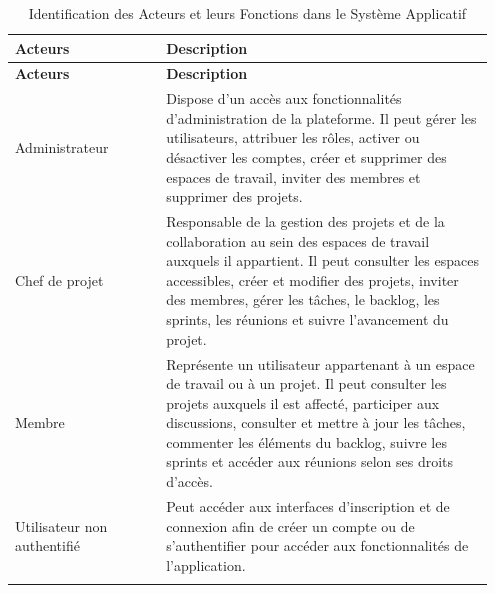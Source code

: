 \begin{longtable}[c]{|p{0.3\linewidth}|p{0.65\linewidth}|}
  \hline
  \textbf{Acteurs}            & \textbf{Description}                                                                                                                                                                                                                                                                                           \\
  \hline
  \endfirsthead

  \hline
  \textbf{Acteurs}            & \textbf{Description}                                                                                                                                                                                                                                                                                           \\
  \hline
  \endhead

  \hline
  \endfoot

  \hline
  \endlastfoot

  Administrateur              & Dispose d'un accès aux fonctionnalités d'administration de la plateforme. Il peut gérer les utilisateurs, attribuer les rôles, activer ou désactiver les comptes, créer et supprimer des espaces de travail, inviter des membres et supprimer des projets.                                                     \\
  \hline

  Chef de projet              & Responsable de la gestion des projets et de la collaboration au sein des espaces de travail auxquels il appartient. Il peut consulter les espaces accessibles, créer et modifier des projets, inviter des membres, gérer les tâches, le backlog, les sprints, les réunions et suivre l'avancement du projet.   \\
  \hline

  Membre                      & Représente un utilisateur appartenant à un espace de travail ou à un projet. Il peut consulter les projets auxquels il est affecté, participer aux discussions, consulter et mettre à jour les tâches, commenter les éléments du backlog, suivre les sprints et accéder aux réunions selon ses droits d'accès. \\
  \hline

  Utilisateur non authentifié & Peut accéder aux interfaces d'inscription et de connexion afin de créer un compte ou de s'authentifier pour accéder aux fonctionnalités de l'application.                                                                                                                                                      \\
  \hline

  \caption{\centering Identification des Acteurs et leurs Fonctions dans le Système Applicatif}
  \label{tab:acteurIdent}
\end{longtable}

